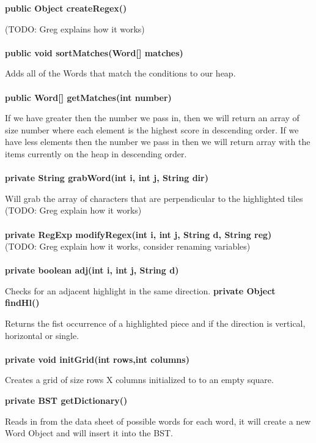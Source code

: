 \documentclass[11pt]{article}
\begin{document}
\textbf{public Object createRegex()\\}

(TODO: Greg explains how it works)\\\\
%
\textbf{public void sortMatches(Word[] matches)}

Adds all of the Words that match the conditions to our heap.\\\\

\textbf{public Word[] getMatches(int number)\\}

If we have greater then the number we pass in, then we will return an array of size number where each element is the highest score in descending order. If we have less elements then the number we pass in then we will return array with the items currently on the heap in descending order.\\\\

\textbf{private String grabWord(int i, int j, String dir)\\}

Will grab the array of characters that are perpendicular to the highlighted tiles \\
(TODO: Greg explain how it works)\\\\

\textbf{private RegExp modifyRegex(int i, int j, String d, String reg)\\}
(TODO: Greg explain how it works,  consider renaming variables)\\\\
%
\textbf{private boolean adj(int i, int j, String d)\\}

Checks for an adjacent highlight in the same direction.
%
\textbf{private Object findHl()\\}

Returns the fist occurrence of a highlighted piece and if the direction is vertical, horizontal or single.\\\\
\textbf{private void initGrid(int rows,int columns)\\}

Creates a grid of size rows X columns initialized to to an empty square.

\textbf{private BST getDictionary()}

Reads in from the data sheet of possible words for each word, it will create a new Word Object and will insert it into the BST.\\\\
\end{document}

